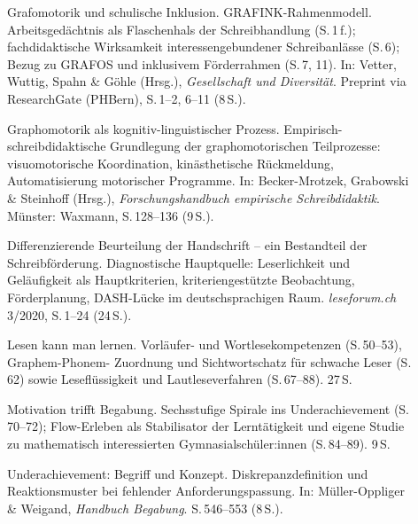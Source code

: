 \documentclass[ngerman, a4paper]{article}
\begin{document}
\begin{description}
  \item[\cite{saegesserwyss2021grafinkrahmenmodell}] Grafomotorik und
        schulische Inklusion. GRAFINK-Rahmenmodell. Arbeitsgedächtnis als
        Flaschenhals der Schreibhandlung (S.\,1\,f.); fachdidaktische
        Wirksamkeit interessengebundener Schreibanlässe (S.\,6); Bezug
        zu GRAFOS und inklusivem Förderrahmen (S.\,7, 11). In: Vetter,
        Wuttig, Spahn \& Göhle (Hrsg.), \textit{Gesellschaft und
          Diversität}. Preprint via ResearchGate (PHBern),
        S.\,1--2, 6--11 (8\,S.).
  \item[\cite{nottbusch2017graphomotorik}] Graphomotorik als
        kognitiv-linguistischer Prozess. Empirisch-schreibdidaktische
        Grundlegung der graphomotorischen Teilprozesse: visuomotorische
        Koordination, kinästhetische Rückmeldung, Automatisierung
        motorischer Programme. In: Becker-Mrotzek, Grabowski \&
        Steinhoff (Hrsg.), \textit{Forschungshandbuch empirische
          Schreibdidaktik}. Münster: Waxmann, S.\,128--136 (9\,S.).
  \item[\cite{hurschler2020handschriftbeurteilung}] Differenzierende
        Beurteilung der Handschrift -- ein Bestandteil der Schreibförderung.
        Diagnostische Hauptquelle: Leserlichkeit und Geläufigkeit als
        Hauptkriterien, kriteriengestützte Beobachtung, Förderplanung,
        DASH-Lücke im deutschsprachigen Raum.
        \textit{leseforum.ch} 3/2020, S.\,1--24 (24\,S.).
  \item[\cite{gold2018lesenkannmanlernen}] Lesen kann man lernen.
        Vorläufer- und Wortlesekompetenzen (S.\,50--53), Graphem-Phonem-
        Zuordnung und Sichtwortschatz für schwache Leser (S.\,62) sowie
        Leseflüssigkeit und Lautleseverfahren (S.\,67--88). 27\,S.
  \item[\cite{lehwald2017motivation}] Motivation trifft Begabung.
        Sechsstufige Spirale ins Underachievement (S.\,70--72);
        Flow-Erleben als Stabilisator der Lerntätigkeit und eigene Studie
        zu mathematisch interessierten Gymnasialschüler:innen
        (S.\,84--89). 9\,S.
  \item[\cite{greiten2021underachievement}] Underachievement: Begriff
        und Konzept. Diskrepanzdefinition und Reaktionsmuster bei
        fehlender Anforderungspassung. In: Müller-Oppliger \& Weigand,
        \textit{Handbuch Begabung}. S.\,546--553 (8\,S.).
\end{description}
\end{document}
